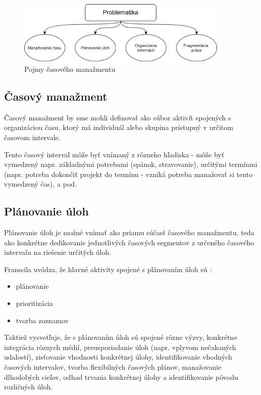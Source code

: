 \documentclass[10pt,slovak,a4paper]{article}
\begin{document}
	\paragraph{}
	\begin{figure}[tbh]
		\centering
		\includegraphics[width=0.9\textwidth]{problematika.png}
	\caption{Pojmy časového manažmentu}
	\label{f:pojmy}
	\end{figure}
	
	\subsection{Časový manažment} \label{casovy_manazment}
	
		Časový manažment by sme mohli definovať ako súbor aktivít spojených s organizáciou času, ktorý má individuál alebo skupina prístupný v určitom časovom intervale.
		
		Tento časový interval môže byť vnímaný z rôzneho hľadiska - môže byť vymedzený napr. základnými potrebami (spánok, stravovanie), určitými termínmi (napr. potreba dokončiť projekt do termínu - vzniká potreba manažovať si tento vymedzený čas), a pod.
		
	\subsection{Plánovanie úloh}
	
		Plánovanie úloh je možné vnímať ako priamu súčasť časového manažmentu, teda ako konkrétne dedikovanie jednotlivých časových segmentov z určeného časového intervalu na riešenie určitých úloh.
		
		Franssila uvádza, že hlavné aktivity spojené s plánovaním úloh sú \cite{Franssila}:
		\begin{itemize}
			\item plánovanie
			\item prioritizácia
			\item tvorba zoznamov
		\end{itemize}
		
		Taktiež vysvetľuje, že s plánovaním úloh sú spojené rôzne výzvy, konkrétne integrácia rôznych médií, preusporiadanie úloh (napr. vplyvom nečakaných udalostí), zisťovanie vhodnosti konkrétnej úlohy, identifikovanie vhodných časových intervalov, tvorba flexibilných časových plánov, manažovanie dlhodobých cieľov, odhad trvania konkrétnej úlohy a identifikovanie pôvodu rozličných úloh\cite{Franssila}.
		
\end{document}
